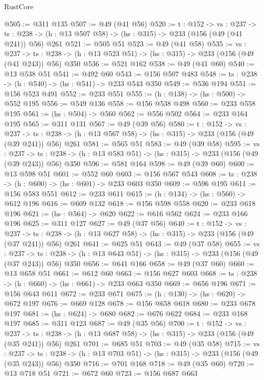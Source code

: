 \begin{lexlean}{RustCore}
\begin{coremodule}
@505 := @311 @135
@507 := @49 (@41 @56)
@520 := {t : @152} ->
  {vs : @237} ->
  {ts : @238} -> (h : @13 @507 @58) -> (hs : @315) -> @233 (@156 (@49 (@41 @241)) @56) @261
@521 := @505 @51
@523 := @49 (@41 @58)
@535 := {vs : @237} ->
  {ts : @238} -> (h : @13 @523 @51) -> (hs : @315) -> @233 (@156 (@49 (@41 @243)) @56) @350
@536 := @521 @162
@538 := @49 (@41 @60)
@540 := @13 @538 @51
@541 := @492 @60
@543 := @156 @507 @483
@548 := {ts : @238} -> (h : @540) -> (hs : @541) -> @233 @543 @350
@549 := @536 @194
@551 := @156 @523 @491
@552 := @233 @551
@555 := (h : @138) -> (hs : @500) -> @552 @195
@556 := @549 @136
@558 := @156 @538 @498
@560 := @233 @558 @195
@561 := (hs : @504) -> @560
@562 := @556 @502
@564 := @233 @164 @195
@565 := @311 @131
@567 := @49 (@39 @56)
@580 := {t : @152} ->
  {vs : @237} ->
  {ts : @238} -> (h : @13 @567 @58) -> (hs : @315) -> @233 (@156 (@49 (@39 @241)) @56) @261
@581 := @565 @51
@583 := @49 (@39 @58)
@595 := {vs : @237} ->
  {ts : @238} -> (h : @13 @583 @51) -> (hs : @315) -> @233 (@156 (@49 (@39 @243)) @56) @350
@596 := @581 @164
@598 := @49 (@39 @60)
@600 := @13 @598 @51
@601 := @552 @60
@603 := @156 @567 @543
@608 := {ts : @238} -> (h : @600) -> (hs : @601) -> @233 @603 @350
@609 := @596 @195
@611 := @156 @583 @551
@612 := @233 @611
@615 := (h : @134) -> (hs : @560) -> @612 @196
@616 := @609 @132
@618 := @156 @598 @558
@620 := @233 @618 @196
@621 := (hs : @564) -> @620
@622 := @616 @562
@624 := @233 @166 @196
@625 := @311 @127
@627 := @49 (@37 @56)
@640 := {t : @152} ->
  {vs : @237} ->
  {ts : @238} -> (h : @13 @627 @58) -> (hs : @315) -> @233 (@156 (@49 (@37 @241)) @56) @261
@641 := @625 @51
@643 := @49 (@37 @58)
@655 := {vs : @237} ->
  {ts : @238} -> (h : @13 @643 @51) -> (hs : @315) -> @233 (@156 (@49 (@37 @243)) @56) @350
@656 := @641 @166
@658 := @49 (@37 @60)
@660 := @13 @658 @51
@661 := @612 @60
@663 := @156 @627 @603
@668 := {ts : @238} -> (h : @660) -> (hs : @661) -> @233 @663 @350
@669 := @656 @196
@671 := @156 @643 @611
@672 := @233 @671
@675 := (h : @130) -> (hs : @620) -> @672 @197
@676 := @669 @128
@678 := @156 @658 @618
@680 := @233 @678 @197
@681 := (hs : @624) -> @680
@682 := @676 @622
@684 := @233 @168 @197
@685 := @311 @123
@687 := @49 (@35 @56)
@700 := {t : @152} ->
  {vs : @237} ->
  {ts : @238} -> (h : @13 @687 @58) -> (hs : @315) -> @233 (@156 (@49 (@35 @241)) @56) @261
@701 := @685 @51
@703 := @49 (@35 @58)
@715 := {vs : @237} ->
  {ts : @238} -> (h : @13 @703 @51) -> (hs : @315) -> @233 (@156 (@49 (@35 @243)) @56) @350
@716 := @701 @168
@718 := @49 (@35 @60)
@720 := @13 @718 @51
@721 := @672 @60
@723 := @156 @687 @663

\end{coremodule}
\end{lexlean}
